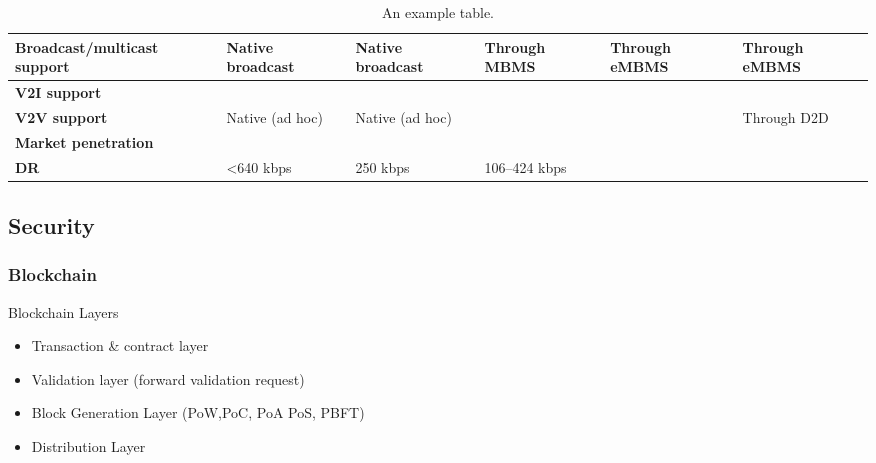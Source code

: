 \begin{table}[h!]
\begin{tabulary}{\textwidth}{L|L|L|L|L|L}
	\bf{Broadcast/multicast support} & Native broadcast                                      & Native broadcast                                      & Through MBMS                     & Through eMBMS            & Through eMBMS             \\\hline
	\bf{V2I support}                 & \ok                                                   & \ok                                                   & \ok                              & \ok                      & \ok                       \\\hline
	\bf{V2V support}                 & Native (ad hoc)                                       & Native (ad hoc)                                       & \ko                              & \ko                      & Through D2D               \\\hline
	\bf{Market penetration}          & \ok                                                   & \ko                                                   & \ok                              & \ok                      & \ok                       \\\hline
	\bf{\ac{DR}}                   & <640 kbps                                        & 250 kbps                                              & 106–424 kbps                              & \ok                      & \ok                       \\\hline
	\end{tabulary}
	\caption{\label{tab:Tableppp} An example table.}
\end{table}





\subsection{Security}

\subsubsection{Blockchain}

Blockchain Layers
\begin{itemize}
	\item Transaction \& contract layer
	\item Validation layer (forward validation request)
	\item Block Generation Layer (PoW,PoC, PoA PoS, PBFT)
	\item Distribution Layer
	\\
\end{itemize}

